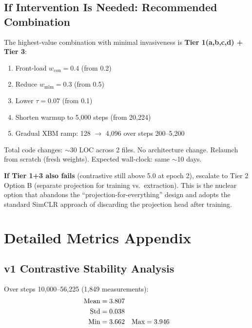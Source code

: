 \documentclass[11pt,a4paper]{article}
\begin{document}
\subsection{If Intervention Is Needed: Recommended Combination}

The highest-value combination with minimal invasiveness is \textbf{Tier 1(a,b,c,d) + Tier 3}:

\begin{enumerate}[nosep]
  \item Front-load $w_{\text{con}} = 0.4$ (from 0.2)
  \item Reduce $w_{\text{mlm}} = 0.3$ (from 0.5)
  \item Lower $\tau = 0.07$ (from 0.1)
  \item Shorten warmup to 5{,}000 steps (from 20{,}224)
  \item Gradual XBM ramp: 128 $\to$ 4{,}096 over steps 200--5{,}200
\end{enumerate}

Total code changes: $\sim$30 LOC across 2 files. No architecture change. Relaunch
from scratch (fresh weights). Expected wall-clock: same $\sim$10 days.

\textbf{If Tier 1+3 also fails} (contrastive still above 5.0 at epoch 2), escalate
to Tier 2 Option B (separate projection for training vs.\ extraction). This is the
nuclear option that abandons the ``projection-for-everything'' design and adopts the
standard SimCLR approach of discarding the projection head after training.


\section{Detailed Metrics Appendix}

\subsection{v1 Contrastive Stability Analysis}

Over steps 10{,}000--56{,}225 (1{,}849 measurements):
\begin{align}
\text{Mean} &= 3.807 \notag \\
\text{Std}  &= 0.038 \notag \\
\text{Min}  &= 3.662 \quad \text{Max} = 3.946 \notag
\end{align}
\end{document}
